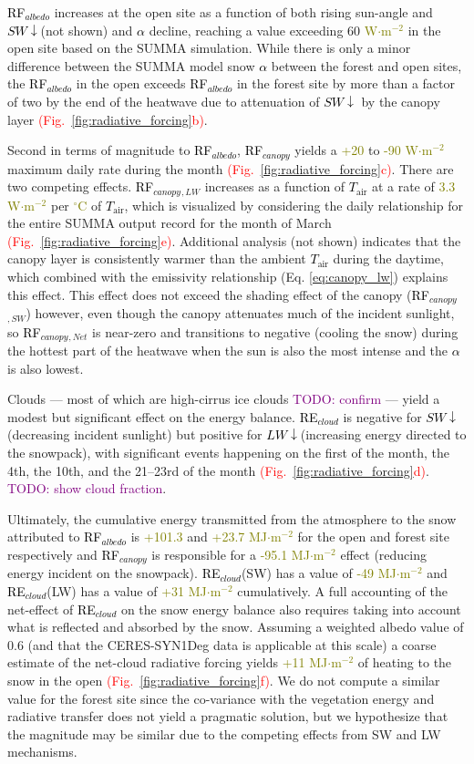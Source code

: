 \documentclass[draft]{agujournal2019}
\newcommand{\fig}[2]{\textcolor{red}{(Fig.~\ref{#1}{#2})}}   %
\newcommand{\todo}[1]{\textcolor{purple}{TODO: #1}}      %
\newcommand{\mynum}[1]{\textcolor{olive}{#1}}
\newcommand{\tair}{\textcolor{black}{$T_{\mathrm{air}}$}\xspace}
\newcommand{\lwdn}{\textcolor{black}{$LW\downarrow$}\xspace}
\newcommand{\swdn}{\textcolor{black}{$SW\downarrow$}\xspace}
\newcommand{\albedo}{\textcolor{black}{$\alpha$}\xspace}
\newcommand{\rfalb}{\textcolor{black}{RF$_{albedo}$}\xspace}
\newcommand{\rfcirrus}{\textcolor{black}{RE$_{cloud}$}\xspace}
\newcommand{\rfcanopy}{\textcolor{black}{RF$_{canopy}$}\xspace}
\newcommand{\wmsq}{\textcolor{olive}{W$\cdot$m$^{-2}$}\xspace}
\newcommand{\degrc}{\textcolor{olive}{$^\circ$C}\xspace}
\newcommand{\mjmtwo}{\textcolor{olive}{MJ$\cdot$m$^{-2}$}\xspace}
\begin{document}
\rfalb increases at the open site as a function of both rising sun-angle and \swdn (not shown) and \albedo decline, reaching a value exceeding 60 \wmsq in the open site based on the SUMMA simulation.
While there is only a minor difference between the SUMMA model snow \albedo between the forest and open sites, the \rfalb in the open exceeds \rfalb in the forest site by more than a factor of two by the end of the heatwave due to attenuation of \swdn by the canopy layer \fig{fig:radiative_forcing}{b}.


Second in terms of magnitude to \rfalb , \rfcanopy yields a \mynum{+20} to \mynum{-90} \wmsq maximum daily rate during the month \fig{fig:radiative_forcing}{c}.
There are two competing effects.
\rfcanopy$_{,LW}$ increases as a function of \tair at a rate of \mynum{3.3} \wmsq per \degrc of \tair, which is visualized by considering the daily relationship for the entire SUMMA output record for the month of March \fig{fig:radiative_forcing}{e}.
Additional analysis (not shown) indicates that the canopy layer is consistently warmer than the ambient \tair during the daytime, which combined with the emissivity relationship (Eq. \ref{eq:canopy_lw}) explains this effect.
This effect does not exceed the shading effect of the canopy (\rfcanopy$_{,SW}$) however, even though the canopy attenuates much of the incident sunlight, so \rfcanopy$_{,Net}$ is near-zero and transitions to negative (cooling the snow) during the hottest part of the heatwave when the sun is also the most intense and the \albedo is also lowest.

Clouds --- most of which are high-cirrus ice clouds \todo{confirm} --- yield a modest but significant effect on the energy balance.
\rfcirrus is negative for \swdn (decreasing incident sunlight) but positive for \lwdn (increasing energy directed to the snowpack), with significant events happening on the first of the month, the 4th, the 10th, and the 21--23rd of the month \fig{fig:radiative_forcing}{d}.
\todo{show cloud fraction}.


Ultimately, the cumulative energy transmitted from the atmosphere to the snow attributed to \rfalb is \mynum{+101.3} and \mynum{+23.7} \mjmtwo for the open and forest site respectively and \rfcanopy is responsible for a \mynum{-95.1} \mjmtwo effect (reducing energy incident on the snowpack).
\rfcirrus (SW) has a value of \mynum{-49} \mjmtwo and \rfcirrus (LW) has a value of \mynum{+31} \mjmtwo cumulatively.
A full accounting of the net-effect of \rfcirrus on the snow energy balance also requires taking into account what is reflected and absorbed by the snow.
Assuming a weighted albedo value of 0.6 (and that the CERES-SYN1Deg data is applicable at this scale) a coarse estimate of the net-cloud radiative forcing yields \mynum{+11} \mjmtwo of heating to the snow in the open \fig{fig:radiative_forcing}{f}.
We do not compute a similar value for the forest site since the co-variance with the vegetation energy and radiative transfer does not yield a pragmatic solution, but we hypothesize that the magnitude may be similar due to the competing effects from SW and LW mechanisms.
\end{document}
